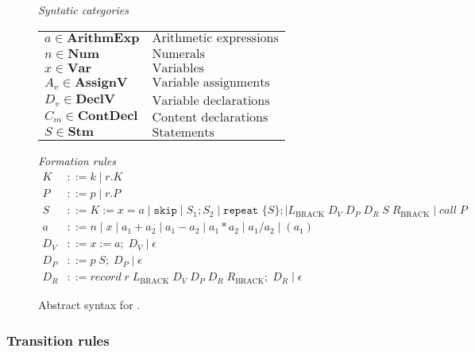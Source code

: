 \begin{figure}[h]
	\centering
	\textit{Syntatic categories}
	\vspace{4mm}


	\begin{tabular}{l l}
		$a \in \textbf{ArithmExp}$ & $\text{Arithmetic expressions}$ \\ 
		$n \in \textbf{Num}$ & $\text{Numerals}$ \\
		$x \in \textbf{Var}$ & $\text{Variables}$ \\
		$A_v \in \textbf{AssignV}$ & $\text{Variable assignments}$ \\
		$D_v \in \textbf{DeclV}$ & $\text{Variable declarations}$ \\
		$C_m \in \textbf{ContDecl}$ & $\text{Content declarations}$ \\
		$S \in \textbf{Stm}$ & $\text{Statements}$
	\end{tabular}

	\vspace{4mm}
	\textit{Formation rules}
	\begin{align*}
		K&::=k\mid r.K \\
		P&::=p\mid r.P \\
		S&::=K:=x=a\mid \texttt{skip}\mid S_1;S_2\mid \texttt{repeat }\{S\}; \mid L_\text{BRACK} \; D_V \; D_P \; D_R \; S \; R_\text{BRACK}\mid call \; P\\
		a&::=n\mid x\mid a_1+a_2\mid a_1-a_2\mid a_1*a_2\mid a_1/a_2\mid (a_1) \\
		D_V&::= x:=a; \; D_V \mid \epsilon \\
		D_P&::= p \; S; \; D_P \mid \epsilon \\
		D_R&::= record \; r \; L_\text{BRACK} \; D_V \; D_P \; D_R \; R_\text{BRACK}; \; D_R \mid \epsilon
	\end{align*}

	\caption{Abstract syntax for \dazel{}.}
	\label{fig:AbstractSyntax}
\end{figure}

\subsubsection*{Transition rules}

